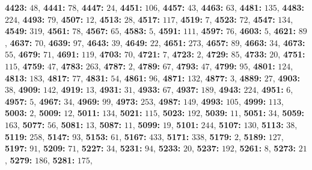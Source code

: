 \textsf{\bfseries 4423:} $48$, \textsf{\bfseries 4441:} $78$, \textsf{\bfseries 4447:} $24$, \textsf{\bfseries 4451:} $106$, \textsf{\bfseries 4457:} $43$, \textsf{\bfseries 4463:} $63$, \textsf{\bfseries 4481:} $135$, \textsf{\bfseries 4483:} $224$, \textsf{\bfseries 4493:} $79$, \textsf{\bfseries 4507:} $12$, \textsf{\bfseries 4513:} $28$, \textsf{\bfseries 4517:} $117$, \textsf{\bfseries 4519:} $7$, \textsf{\bfseries 4523:} $72$, \textsf{\bfseries 4547:} $134$, \textsf{\bfseries 4549:} $319$, \textsf{\bfseries 4561:} $78$, \textsf{\bfseries 4567:} $65$, \textsf{\bfseries 4583:} $5$, \textsf{\bfseries 4591:} $111$, \textsf{\bfseries 4597:} $76$, \textsf{\bfseries 4603:} $5$, \textsf{\bfseries 4621:} $89$, \textsf{\bfseries 4637:} $70$, \textsf{\bfseries 4639:} $97$, \textsf{\bfseries 4643:} $39$, \textsf{\bfseries 4649:} $22$, \textsf{\bfseries 4651:} $273$, \textsf{\bfseries 4657:} $89$, \textsf{\bfseries 4663:} $34$, \textsf{\bfseries 4673:} $55$, \textsf{\bfseries 4679:} $71$, \textsf{\bfseries 4691:} $119$, \textsf{\bfseries 4703:} $70$, \textsf{\bfseries 4721:} $7$, \textsf{\bfseries 4723:} $2$, \textsf{\bfseries 4729:} $85$, \textsf{\bfseries 4733:} $20$, \textsf{\bfseries 4751:} $115$, \textsf{\bfseries 4759:} $47$, \textsf{\bfseries 4783:} $263$, \textsf{\bfseries 4787:} $2$, \textsf{\bfseries 4789:} $67$, \textsf{\bfseries 4793:} $47$, \textsf{\bfseries 4799:} $95$, \textsf{\bfseries 4801:} $124$, \textsf{\bfseries 4813:} $183$, \textsf{\bfseries 4817:} $77$, \textsf{\bfseries 4831:} $54$, \textsf{\bfseries 4861:} $96$, \textsf{\bfseries 4871:} $132$, \textsf{\bfseries 4877:} $3$, \textsf{\bfseries 4889:} $27$, \textsf{\bfseries 4903:} $38$, \textsf{\bfseries 4909:} $142$, \textsf{\bfseries 4919:} $13$, \textsf{\bfseries 4931:} $31$, \textsf{\bfseries 4933:} $67$, \textsf{\bfseries 4937:} $189$, \textsf{\bfseries 4943:} $224$, \textsf{\bfseries 4951:} $6$, \textsf{\bfseries 4957:} $5$, \textsf{\bfseries 4967:} $34$, \textsf{\bfseries 4969:} $99$, \textsf{\bfseries 4973:} $253$, \textsf{\bfseries 4987:} $149$, \textsf{\bfseries 4993:} $105$, \textsf{\bfseries 4999:} $113$, \textsf{\bfseries 5003:} $2$, \textsf{\bfseries 5009:} $12$, \textsf{\bfseries 5011:} $134$, \textsf{\bfseries 5021:} $115$, \textsf{\bfseries 5023:} $192$, \textsf{\bfseries 5039:} $11$, \textsf{\bfseries 5051:} $34$, \textsf{\bfseries 5059:} $163$, \textsf{\bfseries 5077:} $56$, \textsf{\bfseries 5081:} $13$, \textsf{\bfseries 5087:} $11$, \textsf{\bfseries 5099:} $19$, \textsf{\bfseries 5101:} $244$, \textsf{\bfseries 5107:} $130$, \textsf{\bfseries 5113:} $38$, \textsf{\bfseries 5119:} $258$, \textsf{\bfseries 5147:} $93$, \textsf{\bfseries 5153:} $61$, \textsf{\bfseries 5167:} $433$, \textsf{\bfseries 5171:} $338$, \textsf{\bfseries 5179:} $2$, \textsf{\bfseries 5189:} $127$, \textsf{\bfseries 5197:} $91$, \textsf{\bfseries 5209:} $71$, \textsf{\bfseries 5227:} $34$, \textsf{\bfseries 5231:} $94$, \textsf{\bfseries 5233:} $20$, \textsf{\bfseries 5237:} $192$, \textsf{\bfseries 5261:} $8$, \textsf{\bfseries 5273:} $21$, \textsf{\bfseries 5279:} $186$, \textsf{\bfseries 5281:} $175$, 
